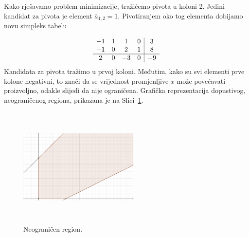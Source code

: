 \documentclass[a4paper, utf8, 11pt, colorlinks]{book}
\theoremstyle{definition}
\begin{document}
Kako rješavamo problem minimizacije, tražićemo pivota u koloni 2. Jedini kandidat za pivota je element  $\overline{a}_{1, 2} = 1$. Pivotiranjem oko tog elementa dobijamo novu simpleks tabelu 

$$\begin{array}{cccc| c} 
		   -1 & 1  & 1  &  0 & 3 \\
		   -1 & 0  & 2  &  1 & 8 \\ \hline
		   2  & 0  & -3 &  0 & -9 \\
\end{array}$$
Kandidata za pivota tražimo u prvoj koloni. Međutim, kako su svi elementi prve kolone negativni, to znači da se 
vrijednost  promjenljive $x$  može povećavati proizvoljno, odakle slijedi da nije ograničena. 
Grafička reprezentacija dopustivog, neograničenog regiona, prikazana je na  Slici~\ref{fig:unbounded-example-solve}. 


\begin{figure}[!ht]
    \centering
    \includegraphics[width=170pt,height=170pt]{unbounded-example-solve.eps}
    \caption{Neograničen region.}
    \label{fig:unbounded-example-solve}
\end{figure}
\end{document}
